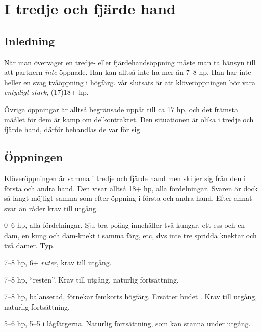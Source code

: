\chapter{I tredje och fjärde hand}

\section{Inledning}

När man överväger en tredje- eller fjärdehandsöppning måste man ta
hänsyn till att partnern {\em inte} öppnade. Han kan alltså inte ha
mer än 7--8 hp. Han har inte heller
en svag tvåöppning i högfärg. vår slutsats är att 
 klöveröppningen bör vara \emph{entydigt stark}, (17)18+ hp.

Övriga öppningar är alltså begränsade uppåt till ca 17 hp, och det främsta
mäålet för dem är kamp om delkontraktet. Den situationen är olika i tredje
och fjärde hand, därför behandlas de var för sig.

\section{Öppningen }

Klöveröppningen är samma i tredje och fjärde hand men skiljer sig från den
i första och andra hand. Den visar alltså 18+ hp, alla fördelningar. Svaren är
dock så långt möjligt samma som efter öppning i första och andra
hand. Efter annat svar än  råder krav till utgång. 

\bbe

\item[--\ru{1}]
\bnu
  \item 0--6 hp, alla fördelningar. Sju bra poäng innehåller två
  kungar, ett ess och en dam, en kung och dam-knekt i samma färg, etc, dvs
  inte tre spridda knektar och två damer. Typ.

\item 7--8 hp, 6+ \emph{ruter}, krav till utgång.
\enu
  
\item[--\hj{1}] 7--8 hp, ``resten''. Krav till utgång, naturlig fortsättning.

\item[--\spa{1}] 7--8 hp, balanserad, förnekar femkorts högfärg. Ersätter
  budet . Krav till utgång, naturlig fortsättning.

\item[--\NT{1}] 5--6 hp, 5--5 i lågfärgerna. Naturlig fortsättning, som kan
  stanna under utgång.


